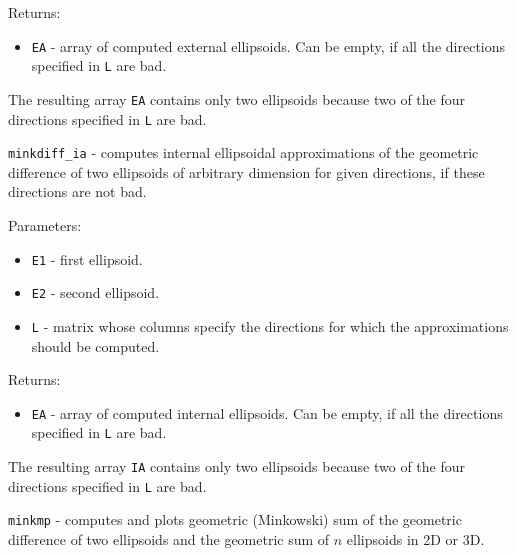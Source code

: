 \documentclass{report}
\begin{document}
Returns:
\begin{itemize}
\item {\tt EA} - array of computed external ellipsoids. Can be empty, if
all the directions specified in {\tt L} are bad.
\end{itemize}


The resulting array {\tt EA} contains only two ellipsoids because two
of the four directions specified in {\tt L} are bad.

\newpage

{\Large {\tt minkdiff\_ia}} - computes internal ellipsoidal approximations
of the geometric difference of two ellipsoids of arbitrary dimension
for given directions, if these directions are not bad.

Parameters:
\begin{itemize}
\item {\tt E1} - first ellipsoid.
\item {\tt E2} - second ellipsoid.
\item {\tt L} - matrix whose columns specify the directions for which
the approximations should be computed.
\end{itemize}

Returns:
\begin{itemize}
\item {\tt EA} - array of computed internal ellipsoids. Can be empty, if
all the directions specified in {\tt L} are bad.
\end{itemize}


The resulting array {\tt IA} contains only two ellipsoids because two
of the four directions specified in {\tt L} are bad.

\newpage

{\Large {\tt minkmp}} - computes and plots geometric (Minkowski) sum of the
geometric difference of two ellipsoids and the geometric sum of $n$ ellipsoids
in 2D or 3D.
\end{document}
